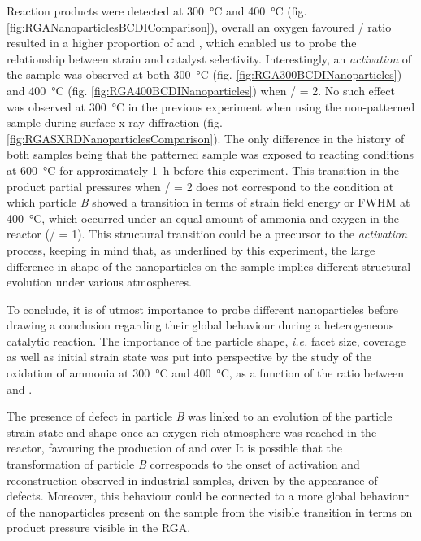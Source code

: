 Reaction products were detected at \qty{300}{\degreeCelsius} and \qty{400}{\degreeCelsius} (fig. \ref{fig:RGANanoparticlesBCDIComparison}), overall an oxygen favoured / ratio resulted in a higher proportion of  and , which enabled us to probe the relationship between strain and catalyst selectivity.
Interestingly, an \textit{activation} of the sample was observed at both \qty{300}{\degreeCelsius} (fig. \ref{fig:RGA300BCDINanoparticles}) and \qty{400}{\degreeCelsius} (fig. \ref{fig:RGA400BCDINanoparticles}) when / = 2.
No such effect was observed at \qty{300}{\degreeCelsius} in the previous experiment when using the non-patterned sample during surface x-ray diffraction (fig. \ref{fig:RGASXRDNanoparticlesComparison}).
The only difference in the history of both samples being that the patterned sample was exposed to reacting conditions at \qty{600}{\degreeCelsius} for approximately \qty{1}{\hour} before this experiment.
This transition in the product partial pressures when / = 2 does not correspond to the condition at which particle \textit{B} showed a transition in terms of strain field energy or FWHM at \qty{400}{\degreeCelsius}, which occurred under an equal amount of ammonia and oxygen in the reactor (/ = 1).
This structural transition could be a precursor to the \textit{activation} process, keeping in mind that, as underlined by this experiment, the large difference in shape of the nanoparticles on the sample implies different structural evolution under various atmospheres.

To conclude, it is of utmost importance to probe different nanoparticles before drawing a conclusion regarding their global behaviour during a heterogeneous catalytic reaction.
The importance of the particle shape, \textit{i.e.} facet size, coverage as well as initial strain state was put into perspective by the study of the oxidation of ammonia at \qty{300}{\degreeCelsius} and \qty{400}{\degreeCelsius}, as a function of the ratio between  and \ammonia.

The presence of defect in particle \textit{B} was linked to an evolution of the particle strain state and shape once an oxygen rich atmosphere was reached in the reactor, favouring the production of  and  over 
It is possible that the transformation of particle \textit{B} corresponds to the onset of activation and reconstruction observed in industrial samples, driven by the appearance of defects.
Moreover, this behaviour could be connected to a more global behaviour of the nanoparticles present on the sample from the visible transition in terms on product pressure visible in the RGA.

